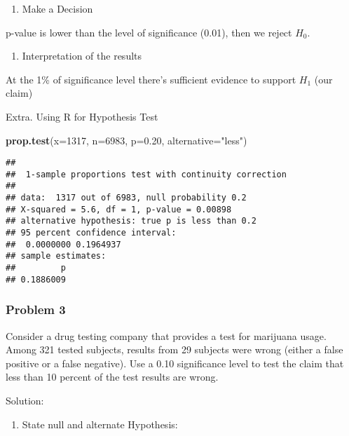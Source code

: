 \documentclass[
]{article}
\newenvironment{Shaded}{\begin{snugshade}}{\end{snugshade}}
\newcommand{\AttributeTok}[1]{\textcolor[rgb]{0.13,0.29,0.53}{#1}}
\newcommand{\DecValTok}[1]{\textcolor[rgb]{0.00,0.00,0.81}{#1}}
\newcommand{\FloatTok}[1]{\textcolor[rgb]{0.00,0.00,0.81}{#1}}
\newcommand{\FunctionTok}[1]{\textcolor[rgb]{0.13,0.29,0.53}{\textbf{#1}}}
\newcommand{\NormalTok}[1]{#1}
\newcommand{\StringTok}[1]{\textcolor[rgb]{0.31,0.60,0.02}{#1}}
\providecommand{\tightlist}{%
  \setlength{\itemsep}{0pt}\setlength{\parskip}{0pt}}
\begin{document}
\begin{enumerate}
\def\labelenumi{\arabic{enumi}.}
\setcounter{enumi}{3}
\tightlist
\item
  Make a Decision
\end{enumerate}

p-value is lower than the level of significance (0.01), then we reject
\(H_{0}\).

\begin{enumerate}
\def\labelenumi{\arabic{enumi}.}
\setcounter{enumi}{4}
\tightlist
\item
  Interpretation of the results
\end{enumerate}

At the 1\% of significance level there's sufficient evidence to support
\(H_{1}\) (our claim)

Extra. Using R for Hypothesis Test

\begin{Shaded}
\begin{Highlighting}[]
\FunctionTok{prop.test}\NormalTok{(}\AttributeTok{x=}\DecValTok{1317}\NormalTok{, }\AttributeTok{n=}\DecValTok{6983}\NormalTok{, }\AttributeTok{p=}\FloatTok{0.20}\NormalTok{, }\AttributeTok{alternative=}\StringTok{"less"}\NormalTok{)}
\end{Highlighting}
\end{Shaded}

\begin{verbatim}
## 
##  1-sample proportions test with continuity correction
## 
## data:  1317 out of 6983, null probability 0.2
## X-squared = 5.6, df = 1, p-value = 0.00898
## alternative hypothesis: true p is less than 0.2
## 95 percent confidence interval:
##  0.0000000 0.1964937
## sample estimates:
##         p 
## 0.1886009
\end{verbatim}

\hypertarget{problem-3}{%
\subsubsection{Problem 3}\label{problem-3}}

Consider a drug testing company that provides a test for marijuana
usage. Among 321 tested subjects, results from 29 subjects were wrong
(either a false positive or a false negative). Use a 0.10 significance
level to test the claim that less than 10 percent of the test results
are wrong.

Solution:

\begin{enumerate}
\def\labelenumi{\arabic{enumi}.}
\tightlist
\item
  State null and alternate Hypothesis:
\end{enumerate}
\end{document}
